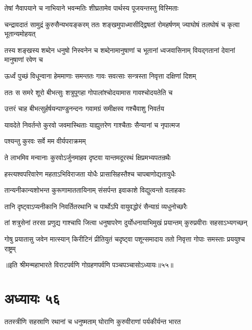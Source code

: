 \twolineshloka
{तेषां नैवापयाने च नाभियाने भवन्मतिः}
{शीघ्रतामेव पार्थस्य पूजयन्तस्तु विस्मिताः}


\threelineshloka
{चन्द्रावदातं सामुद्रं कुरुसैन्यभयङ्करम्}
{ततः शङ्खमुपाध्मासीद्द्विषतां रोमहर्षणम्}
{ज्याघोषं तलघोषं च कृत्वा भूतान्यमोहयत्}


\threelineshloka
{तस्य शङ्खस्य शब्देन धनुषो निस्वनेन च}
{शब्देनामानुषाणां च भूतानां ध्वजवासिनाम्}
{वियद्गतानां देवानां मानुषाणां रवेण च}


\twolineshloka
{ऊर्ध्वं पुच्छं विधून्वाना हेममाणाः समन्ततः}
{गावः सवत्साः सन्त्रस्ता निवृत्ता दक्षिणां दिशम्}


\twolineshloka
{ततः स समरे शूरो बीभत्सुः शत्रुपूगहा}
{गोपालांश्चोदयामास गावश्चोदयतेति च}


\twolineshloka
{उत्तरं चाह बीभत्सुर्हर्षयन्पाण्डुनन्दनः}
{गवामग्रं समीक्षस्व गश्चैवाशु निवर्तय}


\twolineshloka
{यावदेते निवर्तन्ते कुरवो जवमास्थिताः}
{याह्युत्तरेण गाश्चैताः सैन्यानां च नृपात्मज}


\onelineshloka
{पश्यन्तु कुरवः सर्वे मम वीर्यपराक्रमम्}



\twolineshloka
{ते लाभमिव मन्वानाः कुरवोऽर्जुनमाहव}
{दृष्टवा यान्तमदूरस्थं क्षिप्रमभ्यपतन्रथैः}


\twolineshloka
{हस्त्यश्वपरिवारेण महताऽभिविराजता}
{योधैः प्रासासिहस्तैश्च चापबाणोद्यतायुधैः}


\twolineshloka
{तान्यनीकान्यशोभन्त कुरूणामाततायिनाम्}
{संसर्पन्त इवाकाशे विद्युत्वन्तो वलाहकाः}

\twolineshloka
{तानि दृष्ट्वाऽप्यनीकानि निवर्तितरथानि च}
{पार्थोऽपि वायुवद्धोरं सैन्याग्रं व्यधुनोच्छरैः}

\fourlineindentedshloka
{तां शत्रुसेनां तरसा प्रणुद्य}
{गाश्चापि जित्वा धनुषापरेण}
{दुर्योधनायाभिमुखं प्रयान्तम्}
{कुरुप्रवीराः सहसाऽभ्यगच्छन्}


\fourlineindentedshloka
{गोषु प्रयातासु जवेन मात्स्यान्}
{किरीटिनं प्रीतियुतं चदृष्ट्वा}
{पशून्समादाय ततो निवृत्ता}
{गोपाः समस्ताः प्रययुश्च राष्ट्रम्}

॥इति श्रीमन्महाभारते विराटपर्वणि गोग्रहणपर्वणि पञ्चपञ्चासोऽध्यायः॥५५॥

\chapter{अध्यायः ५६}

\twolineshloka
{ततस्त्रीणि सहस्राणि रथानां च धनुष्मताम्}
{घोराणि कुरुवीराणां पर्यकीर्यन्त भारत}


